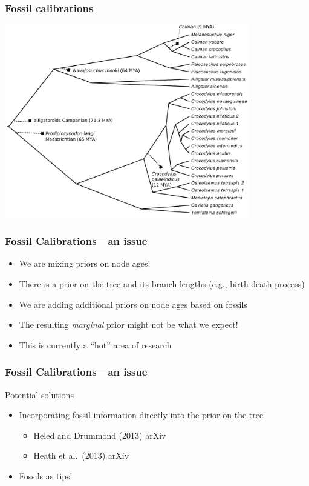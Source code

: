 \begin{frame}
    \frametitle{Fossil calibrations}
    \begin{center}
        \includegraphics[width=0.8\textwidth]{../images/crocodylia-fossils.pdf}
    \end{center}
\end{frame}

\begin{frame}
    \frametitle{Fossil Calibrations---an issue}
    \begin{itemize}
        \item We are mixing priors on node ages!
        \item There is a prior on the tree and its branch
            lengths (e.g., birth-death process)
        \item We are adding additional priors on node ages
            based on fossils
        \item The resulting \emph{marginal} prior might not
            be what we expect!
        \item This is currently a ``hot'' area of research
    \end{itemize}
\end{frame}

\begin{frame}
    \frametitle{Fossil Calibrations---an issue}
    Potential solutions
    \begin{itemize}
        \item Incorporating fossil information directly into
            the prior on the tree
        \begin{itemize}
            \item Heled and Drummond (2013) arXiv
            \item Heath et al.\ (2013) arXiv
        \end{itemize}
        \item Fossils as tips!
    \end{itemize}
\end{frame}

